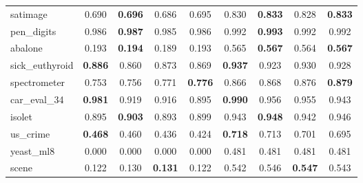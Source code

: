 \begin{figure}[ht]
\begin{tabular}{p{22mm}|*4{p{14mm}}|*4{p{14mm}}}
        satimage&\multicolumn{1}{c}{0.690}&\multicolumn{1}{c}{\textbf{0.696}}&\multicolumn{1}{c}{0.686}&\multicolumn{1}{c|}{0.695}&\multicolumn{1}{c}{0.830}&\multicolumn{1}{c}{\textbf{0.833}}&\multicolumn{1}{c}{0.828}&\multicolumn{1}{c}{\textbf{0.833}}\\
        pen\_digits&\multicolumn{1}{c}{0.986}&\multicolumn{1}{c}{\textbf{0.987}}&\multicolumn{1}{c}{0.985}&\multicolumn{1}{c|}{0.986}&\multicolumn{1}{c}{0.992}&\multicolumn{1}{c}{\textbf{0.993}}&\multicolumn{1}{c}{0.992}&\multicolumn{1}{c}{0.992}\\
        abalone&\multicolumn{1}{c}{0.193}&\multicolumn{1}{c}{\textbf{0.194}}&\multicolumn{1}{c}{0.189}&\multicolumn{1}{c|}{0.193}&\multicolumn{1}{c}{0.565}&\multicolumn{1}{c}{\textbf{0.567}}&\multicolumn{1}{c}{0.564}&\multicolumn{1}{c}{\textbf{0.567}}\\
        sick\_euthyroid&\multicolumn{1}{c}{\textbf{0.886}}&\multicolumn{1}{c}{0.860}&\multicolumn{1}{c}{0.873}&\multicolumn{1}{c|}{0.869}&\multicolumn{1}{c}{\textbf{0.937}}&\multicolumn{1}{c}{0.923}&\multicolumn{1}{c}{0.930}&\multicolumn{1}{c}{0.928}\\
        spectrometer&\multicolumn{1}{c}{0.753}&\multicolumn{1}{c}{0.756}&\multicolumn{1}{c}{0.771}&\multicolumn{1}{c|}{\textbf{0.776}}&\multicolumn{1}{c}{0.866}&\multicolumn{1}{c}{0.868}&\multicolumn{1}{c}{0.876}&\multicolumn{1}{c}{\textbf{0.879}}\\
        car\_eval\_34&\multicolumn{1}{c}{\textbf{0.981}}&\multicolumn{1}{c}{0.919}&\multicolumn{1}{c}{0.916}&\multicolumn{1}{c|}{0.895}&\multicolumn{1}{c}{\textbf{0.990}}&\multicolumn{1}{c}{0.956}&\multicolumn{1}{c}{0.955}&\multicolumn{1}{c}{0.943}\\
        isolet&\multicolumn{1}{c}{0.895}&\multicolumn{1}{c}{\textbf{0.903}}&\multicolumn{1}{c}{0.893}&\multicolumn{1}{c|}{0.899}&\multicolumn{1}{c}{0.943}&\multicolumn{1}{c}{\textbf{0.948}}&\multicolumn{1}{c}{0.942}&\multicolumn{1}{c}{0.946}\\
        us\_crime&\multicolumn{1}{c}{\textbf{0.468}}&\multicolumn{1}{c}{0.460}&\multicolumn{1}{c}{0.436}&\multicolumn{1}{c|}{0.424}&\multicolumn{1}{c}{\textbf{0.718}}&\multicolumn{1}{c}{0.713}&\multicolumn{1}{c}{0.701}&\multicolumn{1}{c}{0.695}\\
        yeast\_ml8&\multicolumn{1}{c}{0.000}&\multicolumn{1}{c}{0.000}&\multicolumn{1}{c}{0.000}&\multicolumn{1}{c|}{0.000}&\multicolumn{1}{c}{0.481}&\multicolumn{1}{c}{0.481}&\multicolumn{1}{c}{0.481}&\multicolumn{1}{c}{0.481}\\
        scene&\multicolumn{1}{c}{0.122}&\multicolumn{1}{c}{0.130}&\multicolumn{1}{c}{\textbf{0.131}}&\multicolumn{1}{c|}{0.122}&\multicolumn{1}{c}{0.542}&\multicolumn{1}{c}{0.546}&\multicolumn{1}{c}{\textbf{0.547}}&\multicolumn{1}{c}{0.543}\\

\end{tabular}
\end{figure}
